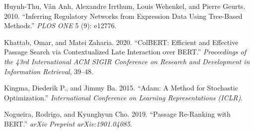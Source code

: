 \documentclass[
  12pt,
]{report}
\newlength{\cslhangindent}
\newenvironment{CSLReferences}[2] %
 {\begin{list}{}{%
  \setlength{\itemindent}{0pt}
  \setlength{\leftmargin}{0pt}
  \setlength{\parsep}{0pt}
  \ifodd #1
   \setlength{\leftmargin}{\cslhangindent}
   \setlength{\itemindent}{-1\cslhangindent}
  \fi
  \setlength{\itemsep}{#2\baselineskip}}}
 {\end{list}}
\begin{document}
\begin{CSLReferences}{1}{1}
Huynh-Thu, Vân Anh, Alexandre Irrthum, Louis Wehenkel, and Pierre
Geurts. 2010. {``Inferring Regulatory Networks from Expression Data
Using Tree-Based Methods.''} \emph{PLOS ONE} 5 (9): e12776.

Khattab, Omar, and Matei Zaharia. 2020. {``{ColBERT}: Efficient and
Effective Passage Search via Contextualized Late Interaction over
{BERT}.''} \emph{Proceedings of the 43rd International ACM SIGIR
Conference on Research and Development in Information Retrieval},
39--48.

Kingma, Diederik P., and Jimmy Ba. 2015. {``Adam: {A} Method for
Stochastic Optimization.''} \emph{International Conference on Learning
Representations (ICLR)}.

Nogueira, Rodrigo, and Kyunghyun Cho. 2019. {``Passage Re-Ranking with
{BERT}.''} \emph{arXiv Preprint arXiv:1901.04085}.

\end{CSLReferences}
\end{document}
